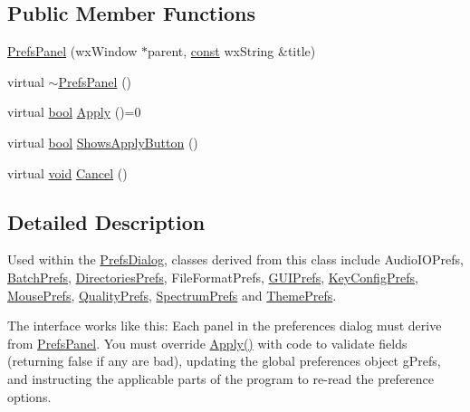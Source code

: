 \subsection*{Public Member Functions}
\begin{DoxyCompactItemize}
\item 
\hyperlink{class_prefs_panel_adeeb72781a4ec4bbc902a5bc62bba999}{Prefs\+Panel} (wx\+Window $\ast$parent, \hyperlink{getopt1_8c_a2c212835823e3c54a8ab6d95c652660e}{const} wx\+String \&title)
\item 
virtual \hyperlink{class_prefs_panel_aab07e3af69402bb1b01c6a59bfe45574}{$\sim$\+Prefs\+Panel} ()
\item 
virtual \hyperlink{mac_2config_2i386_2lib-src_2libsoxr_2soxr-config_8h_abb452686968e48b67397da5f97445f5b}{bool} \hyperlink{class_prefs_panel_ab5572aedab201c47fbbdf714c6a2b781}{Apply} ()=0
\item 
virtual \hyperlink{mac_2config_2i386_2lib-src_2libsoxr_2soxr-config_8h_abb452686968e48b67397da5f97445f5b}{bool} \hyperlink{class_prefs_panel_a089024d6d0e9bb2052a7d62d2f961402}{Shows\+Apply\+Button} ()
\item 
virtual \hyperlink{sound_8c_ae35f5844602719cf66324f4de2a658b3}{void} \hyperlink{class_prefs_panel_a8ce25f2e70e99eca4d32dee3d575d02a}{Cancel} ()
\end{DoxyCompactItemize}


\subsection{Detailed Description}
Used within the \hyperlink{class_prefs_dialog}{Prefs\+Dialog}, classes derived from this class include Audio\+I\+O\+Prefs, \hyperlink{class_batch_prefs}{Batch\+Prefs}, \hyperlink{class_directories_prefs}{Directories\+Prefs}, File\+Format\+Prefs, \hyperlink{class_g_u_i_prefs}{G\+U\+I\+Prefs}, \hyperlink{class_key_config_prefs}{Key\+Config\+Prefs}, \hyperlink{class_mouse_prefs}{Mouse\+Prefs}, \hyperlink{class_quality_prefs}{Quality\+Prefs}, \hyperlink{class_spectrum_prefs}{Spectrum\+Prefs} and \hyperlink{class_theme_prefs}{Theme\+Prefs}. 

The interface works like this\+: Each panel in the preferences dialog must derive from \hyperlink{class_prefs_panel}{Prefs\+Panel}. You must override \hyperlink{class_prefs_panel_ab5572aedab201c47fbbdf714c6a2b781}{Apply()} with code to validate fields (returning false if any are bad), updating the global preferences object g\+Prefs, and instructing the applicable parts of the program to re-\/read the preference options.

